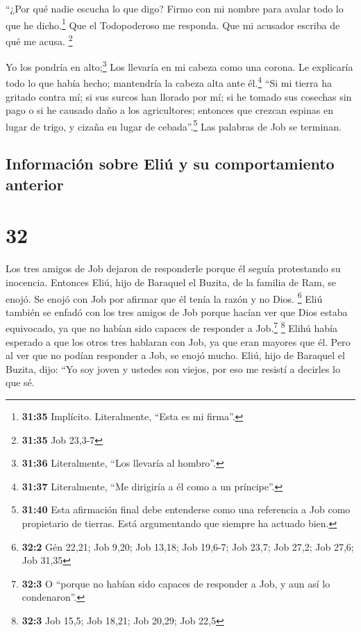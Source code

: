  ``¿Por qué nadie escucha lo que digo? Firmo con mi
nombre para avalar todo lo que he dicho.\footnote{\textbf{31:35}
  Implícito. Literalmente, ``Esta es mi firma''.} Que el Todopoderoso me
responda. Que mi acusador escriba de qué me acusa. \footnote{\textbf{31:35}
  Job 23,3-7}

 Yo los pondría en alto;\footnote{\textbf{31:36}
  Literalmente, ``Los llevaría al hombro''.} Los llevaría en mi cabeza
como una corona.  Le explicaría todo lo que había hecho;
mantendría la cabeza alta ante él.\footnote{\textbf{31:37} Literalmente,
  ``Me dirigiría a él como a un príncipe''.}  ``Si mi
tierra ha gritado contra mí; si sus surcos han llorado por mí;
 si he tomado sus cosechas sin pago o si he causado daño
a los agricultores;  entonces que crezcan espinas en
lugar de trigo, y cizaña en lugar de cebada''.\footnote{\textbf{31:40}
  Esta afirmación final debe entenderse como una referencia a Job como
  propietario de tierras. Está argumentando que siempre ha actuado bien.}
Las palabras de Job se terminan.

\hypertarget{informaciuxf3n-sobre-eliuxfa-y-su-comportamiento-anterior}{%
\subsection{Información sobre Eliú y su comportamiento
anterior}\label{informaciuxf3n-sobre-eliuxfa-y-su-comportamiento-anterior}}

\hypertarget{section-31}{%
\section{32}\label{section-31}}

 Los tres amigos de Job dejaron de responderle porque él
seguía protestando su inocencia.  Entonces Eliú, hijo de
Baraquel el Buzita, de la familia de Ram, se enojó. Se enojó con Job por
afirmar que él tenía la razón y no Dios. \footnote{\textbf{32:2} Gén
  22,21; Job 9,20; Job 13,18; Job 19,6-7; Job 23,7; Job 27,2; Job 27,6;
  Job 31,35}  Eliú también se enfadó con los tres amigos
de Job porque hacían ver que Dios estaba equivocado, ya que no habían
sido capaces de responder a Job.\footnote{\textbf{32:3} O ``porque no
  habían sido capaces de responder a Job, y aun así lo condenaron''.}
\footnote{\textbf{32:3} Job 15,5; Job 18,21; Job 20,29; Job 22,5}
 Elihú había esperado a que los otros tres hablaran con
Job, ya que eran mayores que él.  Pero al ver que no
podían responder a Job, se enojó mucho.  Eliú, hijo de
Baraquel el Buzita, dijo: ``Yo soy joven y ustedes son viejos, por eso
me resistí a decirles lo que sé.

